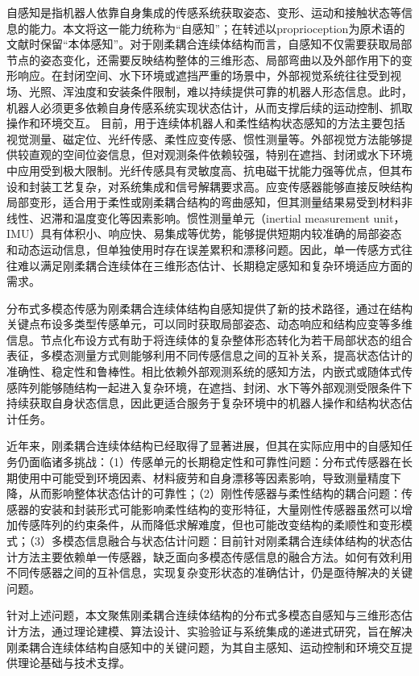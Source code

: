 自感知是指机器人依靠自身集成的传感系统获取姿态、变形、运动和接触状态等信息的能力。本文将这一能力统称为“自感知”；在转述以proprioception为原术语的文献时保留“本体感知”。对于刚柔耦合连续体结构而言，自感知不仅需要获取局部节点的姿态变化，还需要反映结构整体的三维形态、局部弯曲以及外部作用下的变形响应。在封闭空间、水下环境或遮挡严重的场景中，外部视觉系统往往受到视场、光照、浑浊度和安装条件限制，难以持续提供可靠的机器人形态信息。此时，机器人必须更多依赖自身传感系统实现状态估计，从而支撑后续的运动控制、抓取操作和环境交互。
目前，用于连续体机器人和柔性结构状态感知的方法主要包括视觉测量、磁定位、光纤传感、柔性应变传感、惯性测量等\cite{Chen2024VisionbasedTF,Yao2025FastAdaptivePP}。外部视觉方法能够提供较直观的空间位姿信息，但对观测条件依赖较强，特别在遮挡、封闭或水下环境中应用受到极大限制。光纤传感具有灵敏度高、抗电磁干扰能力强等优点，但其布设和封装工艺复杂，对系统集成和信号解耦要求高。应变传感器能够直接反映结构局部变形，适合用于柔性或刚柔耦合结构的弯曲感知，但其测量结果易受到材料非线性、迟滞和温度变化等因素影响。惯性测量单元（inertial measurement unit，IMU）具有体积小、响应快、易集成等优势，能够提供短期内较准确的局部姿态和动态运动信息，但单独使用时存在误差累积和漂移问题。因此，单一传感方式往往难以满足刚柔耦合连续体在三维形态估计、长期稳定感知和复杂环境适应方面的需求。

分布式多模态传感为刚柔耦合连续体结构自感知提供了新的技术路径，通过在结构关键点布设多类型传感单元，可以同时获取局部姿态、动态响应和结构应变等多维信息。节点化布设方式有助于将连续体的复杂整体形态转化为若干局部状态的组合表征，多模态测量方式则能够利用不同传感信息之间的互补关系，提高状态估计的准确性、稳定性和鲁棒性。相比依赖外部观测系统的感知方法，内嵌式或随体式传感阵列能够随结构一起进入复杂环境，在遮挡、封闭、水下等外部观测受限条件下持续获取自身状态信息，因此更适合服务于复杂环境中的机器人操作和结构状态估计任务。

近年来，刚柔耦合连续体结构已经取得了显著进展，但其在实际应用中的自感知任务仍面临诸多挑战：（1）传感单元的长期稳定性和可靠性问题：分布式传感器在长期使用中可能受到环境因素、材料疲劳和自身漂移等因素影响，导致测量精度下降，从而影响整体状态估计的可靠性；（2）刚性传感器与柔性结构的耦合问题：传感器的安装和封装形式可能影响柔性结构的变形特征，大量刚性传感器虽然可以增加传感阵列的约束条件，从而降低求解难度，但也可能改变结构的柔顺性和变形模式；（3）多模态信息融合与状态估计问题：目前针对刚柔耦合连续体结构的状态估计方法主要依赖单一传感器，缺乏面向多模态传感信息的融合方法。如何有效利用不同传感器之间的互补信息，实现复杂变形状态的准确估计，仍是亟待解决的关键问题。

针对上述问题，本文聚焦刚柔耦合连续体结构的分布式多模态自感知与三维形态估计方法，通过理论建模、算法设计、实验验证与系统集成的递进式研究，旨在解决刚柔耦合连续体结构自感知中的关键问题，为其自主感知、运动控制和环境交互提供理论基础与技术支撑。
